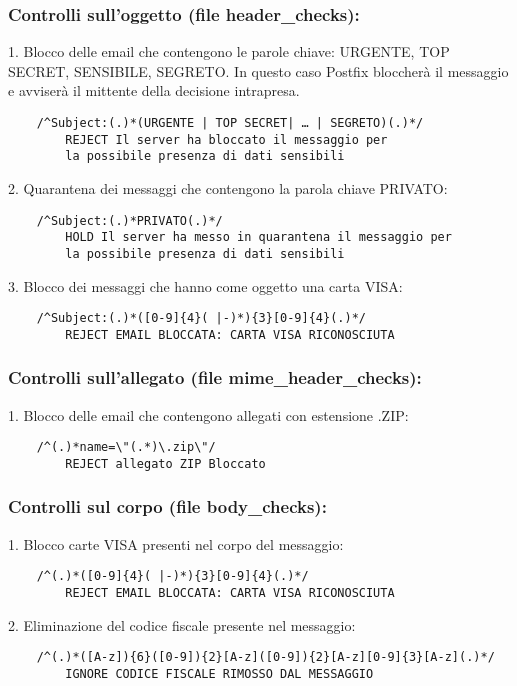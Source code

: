     \subsubsection{Controlli sull'oggetto (file header\_checks):}

    1. Blocco delle email che contengono le parole chiave: URGENTE, TOP SECRET, SENSIBILE, SEGRETO.
    In questo caso Postfix bloccherà il messaggio e avviserà il mittente della decisione intrapresa.

    \begin{verbatim}
    /^Subject:(.)*(URGENTE | TOP SECRET| … | SEGRETO)(.)*/
        REJECT Il server ha bloccato il messaggio per 
        la possibile presenza di dati sensibili
    \end{verbatim}
    2. Quarantena dei messaggi che contengono la parola chiave PRIVATO:
    \begin{verbatim}
    /^Subject:(.)*PRIVATO(.)*/
        HOLD Il server ha messo in quarantena il messaggio per 
        la possibile presenza di dati sensibili
    \end{verbatim}
    3. Blocco dei messaggi che hanno come oggetto una carta VISA:
    \begin{verbatim}
    /^Subject:(.)*([0-9]{4}( |-)*){3}[0-9]{4}(.)*/
        REJECT EMAIL BLOCCATA: CARTA VISA RICONOSCIUTA
    \end{verbatim}


    \subsubsection{Controlli sull'allegato (file mime\_header\_checks):}

    1. Blocco delle email che contengono allegati con estensione .ZIP:

    \begin{verbatim}
    /^(.)*name=\"(.*)\.zip\"/
        REJECT allegato ZIP Bloccato
    \end{verbatim}

    \subsubsection{Controlli sul corpo (file body\_checks):}

    1. Blocco carte VISA presenti nel corpo del messaggio:
    \begin{verbatim}
    /^(.)*([0-9]{4}( |-)*){3}[0-9]{4}(.)*/
        REJECT EMAIL BLOCCATA: CARTA VISA RICONOSCIUTA
    \end{verbatim}
    2. Eliminazione del codice fiscale presente nel messaggio:
    \begin{verbatim}
    /^(.)*([A-z]){6}([0-9]){2}[A-z]([0-9]){2}[A-z][0-9]{3}[A-z](.)*/
        IGNORE CODICE FISCALE RIMOSSO DAL MESSAGGIO
    \end{verbatim}


